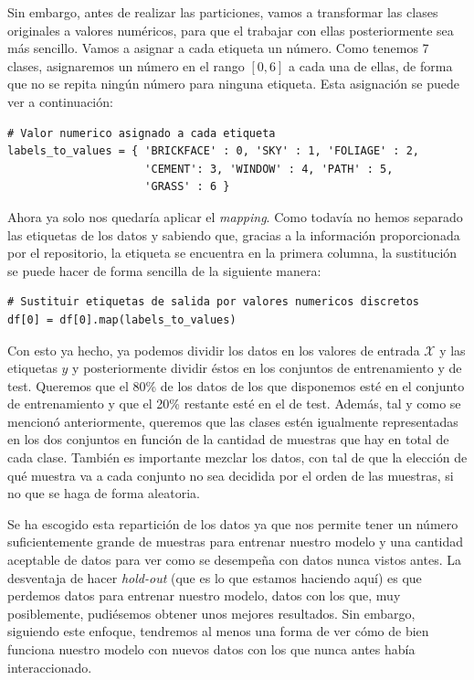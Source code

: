 \documentclass[11pt,a4paper]{article}
\begin{document}
Sin embargo, antes de realizar las particiones, vamos a transformar las clases originales a valores numéricos, para que el trabajar
con ellas posteriormente sea más sencillo. Vamos a asignar a cada etiqueta un número. Como tenemos 7 clases, asignaremos un número
en el rango $[0, 6]$ a cada una de ellas, de forma que no se repita ningún número para ninguna etiqueta. Esta asignación se puede ver a
continuación:

\begin{lstlisting}
# Valor numerico asignado a cada etiqueta
labels_to_values = { 'BRICKFACE' : 0, 'SKY' : 1, 'FOLIAGE' : 2,
                     'CEMENT': 3, 'WINDOW' : 4, 'PATH' : 5,
                     'GRASS' : 6 }
\end{lstlisting}

Ahora ya solo nos quedaría aplicar el \textit{mapping}. Como todavía no hemos separado las etiquetas de los datos y sabiendo que, gracias
a la información proporcionada por el repositorio, la etiqueta se encuentra en la primera columna, la sustitución se puede hacer de forma
sencilla de la siguiente manera:

\begin{lstlisting}
# Sustituir etiquetas de salida por valores numericos discretos
df[0] = df[0].map(labels_to_values)
\end{lstlisting}

Con esto ya hecho, ya podemos dividir los datos en los valores de entrada $\mathcal{X}$ y las etiquetas $y$ y posteriormente dividir
éstos en los conjuntos de entrenamiento y de test. Queremos que el 80\% de los datos de los que disponemos esté en el conjunto de
entrenamiento y que el 20\% restante esté en el de test. Además, tal y como se mencionó anteriormente, queremos que las clases estén
igualmente representadas en los dos conjuntos en función de la cantidad de muestras que hay en total de cada clase. También es importante
mezclar los datos, con tal de que la elección de qué muestra va a cada conjunto no sea decidida por el orden de las muestras, si
no que se haga de forma aleatoria.

Se ha escogido esta repartición de los datos ya que nos permite tener un número suficientemente grande de muestras para entrenar nuestro
modelo y una cantidad aceptable de datos para ver como se desempeña con datos nunca vistos antes. La desventaja de hacer \textit{hold-out}
(que es lo que estamos haciendo aquí) es que perdemos datos para entrenar nuestro modelo, datos con los que, muy posiblemente, pudiésemos
obtener unos mejores resultados. Sin embargo, siguiendo este enfoque, tendremos al menos una forma de ver cómo de bien funciona nuestro
modelo con nuevos datos con los que nunca antes había interaccionado.
\end{document}
